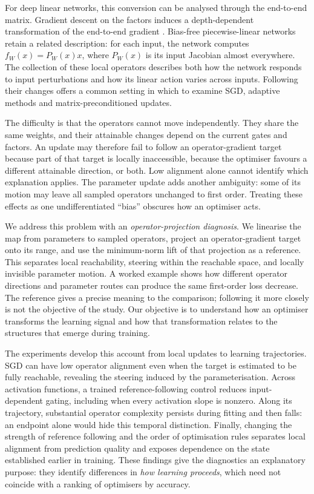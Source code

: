 \documentclass{article}
\theoremstyle{definition}
\theoremstyle{remark}
\begin{document}
For deep linear networks, this conversion can be analysed through the end-to-end matrix. Gradient descent on the factors induces a depth-dependent transformation of the end-to-end gradient \citep{saxe2014exact,arora2018optimization,arora2019implicit}. Bias-free piecewise-linear networks retain a related description: for each input, the network computes $f_W(x)=P_W(x)x$, where $P_W(x)$ is its input Jacobian almost everywhere. The collection of these local operators describes both how the network responds to input perturbations and how its linear action varies across inputs. Following their changes offers a common setting in which to examine SGD, adaptive methods and matrix-preconditioned updates.

The difficulty is that the operators cannot move independently. They share the same weights, and their attainable changes depend on the current gates and factors. An update may therefore fail to follow an operator-gradient target because part of that target is locally inaccessible, because the optimiser favours a different attainable direction, or both. Low alignment alone cannot identify which explanation applies. The parameter update adds another ambiguity: some of its motion may leave all sampled operators unchanged to first order. Treating these effects as one undifferentiated ``bias'' obscures how an optimiser acts.

We address this problem with an \emph{operator-projection diagnosis}. We linearise the map from parameters to sampled operators, project an operator-gradient target onto its range, and use the minimum-norm lift of that projection as a reference. This separates local reachability, steering within the reachable space, and locally invisible parameter motion. A worked example shows how different operator directions and parameter routes can produce the same first-order loss decrease. The reference gives a precise meaning to the comparison; following it more closely is not the objective of the study. Our objective is to understand how an optimiser transforms the learning signal and how that transformation relates to the structures that emerge during training.

The experiments develop this account from local updates to learning trajectories. SGD can have low operator alignment even when the target is estimated to be fully reachable, revealing the steering induced by the parameterisation. Across activation functions, a trained reference-following control reduces input-dependent gating, including when every activation slope is nonzero. Along its trajectory, substantial operator complexity persists during fitting and then falls: an endpoint alone would hide this temporal distinction. Finally, changing the strength of reference following and the order of optimisation rules separates local alignment from prediction quality and exposes dependence on the state established earlier in training. These findings give the diagnostics an explanatory purpose: they identify differences in \emph{how learning proceeds}, which need not coincide with a ranking of optimisers by accuracy.
\end{document}
